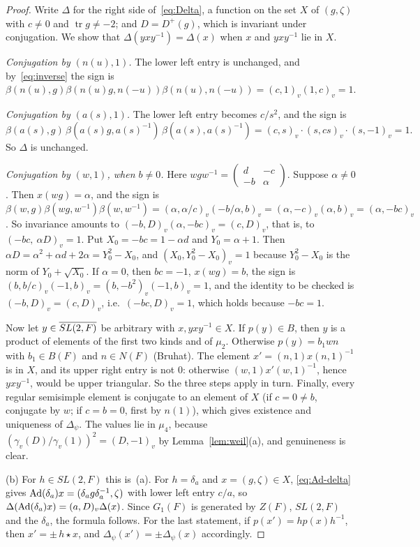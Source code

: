 \begin{proof}
Write $\Delta$ for the right side of~\eqref{eq:Delta}, a function on the
set $X$ of $(g,\zeta)$ with $c\ne0$ and $\operatorname{tr}g\ne-2$; and
$D=D^+(g)$, which is invariant under conjugation. We show that
$\Delta(yxy^{-1})=\Delta(x)$ when $x$ and $yxy^{-1}$ lie in $X$.

\emph{Conjugation by $(n(u),1)$.} The lower left entry is unchanged, and
by~\eqref{eq:inverse} the sign is $\beta(n(u),g)\beta(n(u)g,n(-u))
\beta(n(u),n(-u))=(c,1)_v(1,c)_v=1$.

\emph{Conjugation by $(a(s),1)$.} The lower left entry becomes
$c/s^2$, and the sign is
\[
\beta(a(s),g)\,\beta(a(s)g,a(s)^{-1})\,\beta(a(s),a(s)^{-1})
=(c,s)_v\cdot(s,cs)_v\cdot(s,-1)_v=1 .
\]
So $\Delta$ is unchanged.

\emph{Conjugation by $(w,1)$, when $b\ne0$.} Here $wgw^{-1}=
\begin{pmatrix}d&-c\\-b&\alpha\end{pmatrix}$. Suppose $\alpha\ne0$.
Then $x(wg)=\alpha$, and the sign is $\beta(w,g)\beta(wg,w^{-1})
\beta(w,w^{-1})=(\alpha,\alpha/c)_v(-b/\alpha,b)_v=
(\alpha,-c)_v(\alpha,b)_v=(\alpha,-b c)_v$. So invariance amounts
to $(-b,D)_v(\alpha,-b c)_v=(c,D)_v$, that is, to
$(-b c,\ \alpha D)_v=1$. Put $X_0=-b c=1-\alpha d$ and
$Y_0=\alpha+1$. Then $\alpha D=\alpha^2+\alpha d+2\alpha=Y_0^2-X_0$, and
$(X_0,Y_0^2-X_0)_v=1$ because $Y_0^2-X_0$ is the norm of $Y_0+\sqrt{X_0}$.
If $\alpha=0$, then $b c=-1$, $x(wg)=b$, the sign is
$(b,b/c)_v(-1,b)_v=(b,-b^2)_v(-1,b)_v=1$, and the
identity to be checked is $(-b,D)_v=(c,D)_v$, i.e.\ $(-b c,D)_v=1$,
which holds because $-b c=1$.

Now let $y\in\overline{SL(2,F)}$ be arbitrary with $x,yxy^{-1}\in X$. If $p(y)\in B$,
then $y$ is a product of elements of the first two kinds and of $\mu_2$.
Otherwise $p(y)=b_1wn$ with $b_1\in B(F)$ and $n\in N(F)$ (Bruhat). The
element $x'=(n,1)x(n,1)^{-1}$ is in $X$, and its upper right entry is not
$0$: otherwise $(w,1)x'(w,1)^{-1}$, hence $yxy^{-1}$, would be upper
triangular. So the three steps apply in turn. Finally, every regular
semisimple element is conjugate to an element of $X$ (if $c=0\ne b$,
conjugate by $w$; if $c=b=0$, first by $n(1)$), which gives existence
and uniqueness of $\Delta_\psi$. The values lie in $\mu_4$, because $(\gamma_v(D)/\gamma_v(1))^2=(D,-1)_v$ by Lemma~\ref{lem:weil}(a), and
genuineness is clear.

(b) For $h\in SL(2,F)$ this is~(a). For $h=\delta_a$ and $x=(g,\zeta)\in
X$, \eqref{eq:Ad-delta} gives $\operatorname{Ad}(\delta_a)x=(\delta_ag
\delta_a^{-1},\zeta)$ with lower left entry $c/a$, so
$\Delta(\operatorname{Ad}(\delta_a)x)=(a,D)_v\Delta(x)$. Since $G_1(F)$ is
generated by $Z(F)$, $SL(2,F)$ and the $\delta_a$, the formula follows.
For the last statement, if $p(x')=hp(x)h^{-1}$, then $x'=\pm\,h\star x$,
and $\Delta_\psi(x')=\pm\Delta_\psi(x)$ accordingly.


\end{proof}
